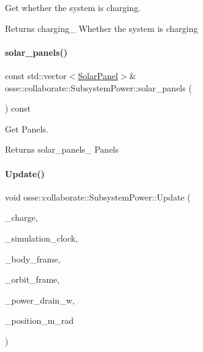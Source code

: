 Get whether the system is charging. 

\begin{DoxyReturn}{Returns}
charging\+\_\+ Whether the system is charging 
\end{DoxyReturn}
\mbox{\label{classosse_1_1collaborate_1_1_subsystem_power_a2167155fe0eea9b74d5603899b4b4183}} 
\paragraph{\texorpdfstring{solar\+\_\+panels()}{solar\_panels()}}
{\footnotesize\ttfamily const std\+::vector$<$\hyperlink{classosse_1_1collaborate_1_1_solar_panel}{Solar\+Panel}$>$\& osse\+::collaborate\+::\+Subsystem\+Power\+::solar\+\_\+panels (\begin{DoxyParamCaption}{ }\end{DoxyParamCaption}) const\hspace{0.3cm}{\ttfamily [inline]}}



Get Panels. 

\begin{DoxyReturn}{Returns}
solar\+\_\+panels\+\_\+ Panels 
\end{DoxyReturn}
\mbox{\label{classosse_1_1collaborate_1_1_subsystem_power_aba48698154d6b98d97c067fcb8c5f924}} 
\paragraph{\texorpdfstring{Update()}{Update()}}
{\footnotesize\ttfamily void osse\+::collaborate\+::\+Subsystem\+Power\+::\+Update (\begin{DoxyParamCaption}\item[{const bool \&}]{\+\_\+charge,  }\item[{const \hyperlink{classosse_1_1collaborate_1_1_simulation_clock}{Simulation\+Clock} \&}]{\+\_\+simulation\+\_\+clock,  }\item[{const \hyperlink{classosse_1_1collaborate_1_1_reference_frame}{Reference\+Frame} \&}]{\+\_\+body\+\_\+frame,  }\item[{const \hyperlink{classosse_1_1collaborate_1_1_reference_frame}{Reference\+Frame} \&}]{\+\_\+orbit\+\_\+frame,  }\item[{const double \&}]{\+\_\+power\+\_\+drain\+\_\+w,  }\item[{const \hyperlink{classosse_1_1collaborate_1_1_vector}{Vector} \&}]{\+\_\+position\+\_\+m\+\_\+rad }\end{DoxyParamCaption})}



